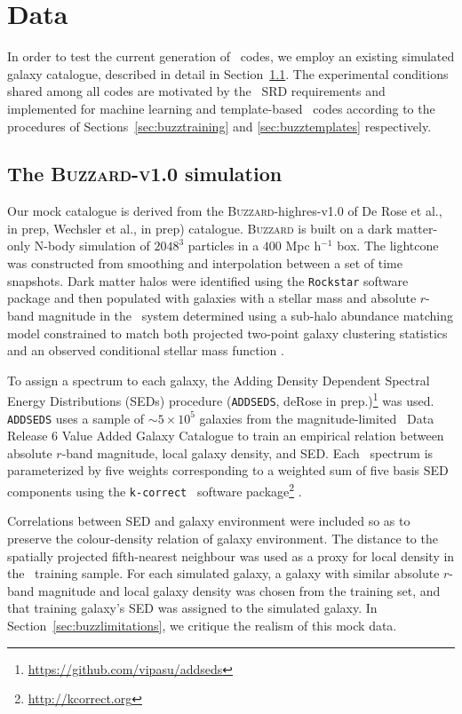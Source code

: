 \section{Data}
\label{sec:sims}

In order to test the current generation of \pzpdf\ codes, we employ an existing simulated galaxy catalogue, described in detail in Section~\ref{sec:buzzard}.
The experimental conditions shared among all codes are motivated by the \lsst\ SRD requirements and implemented for machine learning and template-based \pzpdf\ codes according to the procedures of Sections~\ref{sec:buzztraining} and \ref{sec:buzztemplates} respectively.

\subsection{The \textsc{Buzzard-v1.0} simulation}
\label{sec:buzzard}

Our mock catalogue is derived from the \textsc{Buzzard}-highres-v1.0  of De Rose et al., in prep, Wechsler et al., in prep) catalogue.
\textsc{Buzzard} is built on a dark matter-only N-body simulation of $2048^{3}$ particles in a $400$ Mpc h$^{-1}$ box.
The lightcone was constructed from smoothing and interpolation between a set of time snapshots.
Dark matter halos were identified using the \texttt{Rockstar} software package \citep{Behroozi:13} and then populated with galaxies with a stellar mass and absolute $r$-band magnitude in the \sdss\ system determined using a sub-halo abundance matching model constrained to match both projected two-point galaxy clustering statistics and an observed conditional stellar mass function \citep{Reddick:13}.

To assign a spectrum to each galaxy, the Adding Density Dependent Spectral Energy Distributions (SEDs) procedure (\texttt{ADDSEDS}, deRose in prep.)\footnote{\url{https://github.com/vipasu/addseds}} was used.
\texttt{ADDSEDS} uses a sample of $\sim 5\times 10^{5}$ galaxies from the magnitude-limited \sdss\ Data Release 6 Value Added Galaxy Catalogue \citep{Blanton:05} to train an empirical relation between absolute $r$-band magnitude, local galaxy density, and SED.
Each \sdss\ spectrum is parameterized by five weights corresponding to a weighted sum of five basis SED components using the \texttt{k-correct } software package\footnote{\url{http://kcorrect.org}} \citep{Blanton:07}.

Correlations between SED and galaxy environment were included so as to preserve the colour-density relation of galaxy environment.
The distance to the spatially projected fifth-nearest neighbour was used as a proxy for local density in the \sdss\ training sample.
For each simulated galaxy, a galaxy with similar absolute $r$-band magnitude and local galaxy density was chosen from the training set, and that training galaxy's SED was assigned to the simulated galaxy.
In Section~\ref{sec:buzzlimitations}, we critique the realism of this mock data.

